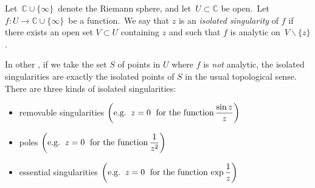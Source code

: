 \documentclass[12pt]{article}
\newcommand{\C}{\mathbf{C}}
\newcounter{123listctr}
\newcounter{123listcolonstylectr}
\newenvironment{123listcolonstyle}{\indent \begin{list}{\arabic{123listcolonstylectr}:}{\usecounter{123listcolonstylectr}}}
                      {\end{list}\setcounter{123listcolonstylectr}{0}}
\begin{document}
%
%	
%	

Let\, $\mathbb{C}\cup\{\infty\}$\, denote the Riemann sphere, and let\, $U\subset \mathbb{C}$ be open.\, Let\, $f\colon U \to \mathbb{C}\cup\{\infty\}$\, be a function.\, We say that $z$ is an \emph{isolated singularity} of $f$ if there exists an open set $V\subset U$ containing $z$ and such that $f$ is analytic on\, $V\!\smallsetminus\!\{z\}$. 

In other , if we take the set $S$ of points in $U$ where $f$ is \emph{not} analytic, the isolated singularities are exactly the isolated points of $S$ in the usual topological sense.\\

There are three kinds of isolated singularities:
\begin{itemize}
\item removable singularities $\displaystyle \left( \text{e.g.\;\;} z = 0 \text{\; for the function\,} \frac{\sin{z}}{z} \right)$
\item poles $\displaystyle \left( \text{e.g.\;\;} z = 0 \text{\; for the function\,} \frac{1}{z^2} \right)$
\item essential singularities $\displaystyle \left( \text{e.g.\;\;} z = 0 \text{\; for the function\,} \exp{\frac{1}{z}} \right)$
\end{itemize}
\end{document}
